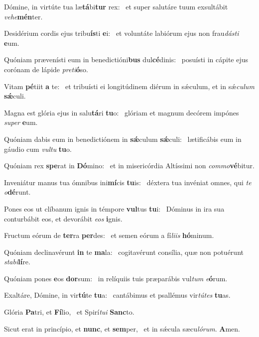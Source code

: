 \item Dómine, in virtúte tua læ\textbf{tá}bi\textbf{tur} rex:~\psstar{} et super salutáre tuum exsultábit \textit{vehe}\textbf{mén}ter.
\item Desidérium cordis ejus tribu\textbf{ís}ti \textbf{e}i:~\psstar{} et voluntáte labiórum ejus non frau\textit{dásti} \textbf{e}um.
\item Quóniam prævenísti eum in benedictióni\textbf{bus} dul\textbf{cé}dinis:~\psstar{} posuísti in cápite ejus corónam de lápide \textit{preti}\textbf{ó}so.
\item Vitam \textbf{pé}tiit \textbf{a} te:~\psstar{} et tribuísti ei longitúdinem diérum in sǽculum, et in sǽ\textit{culum} \textbf{sǽ}culi.
\item Magna est glória ejus in salu\textbf{tá}ri \textbf{tu}o:~\psstar{} glóriam et magnum decórem impónes \textit{super} \textbf{e}um.
\item Quóniam dabis eum in benedictiónem in \textbf{sǽ}culum \textbf{sǽ}culi:~\psstar{} lætificábis eum in gáudio cum \textit{vultu} \textbf{tu}o.
\item Quóniam rex \textbf{spe}rat in \textbf{Dó}mino:~\psstar{} et in misericórdia Altíssimi non \textit{commo}\textbf{vé}bitur.
\item Inveniátur manus tua ómnibus ini\textbf{mí}cis \textbf{tu}is:~\psstar{} déxtera tua invéniat omnes, qui \textit{te} \textit{o}\textbf{dé}runt.
\item Pones eos ut clíbanum ignis in témpore \textbf{vul}tus \textbf{tu}i:~\psstar{} Dóminus in ira sua conturbábit eos, et devorábit \textit{eos} \textbf{i}gnis.
\item Fructum eórum de \textbf{ter}ra \textbf{per}des:~\psstar{} et semen eórum a fí\textit{liis} \textbf{hó}minum.
\item Quóniam declinavérunt \textbf{in} te \textbf{ma}la:~\psstar{} cogitavérunt consília, quæ non potuérunt \textit{stabi}\textbf{lí}re.
\item Quóniam pones \textbf{e}os \textbf{dor}sum:~\psstar{} in relíquiis tuis præparábis vul\textit{tum} \textit{e}\textbf{ó}rum.
\item Exaltáre, Dómine, in vir\textbf{tú}te \textbf{tu}a:~\psstar{} cantábimus et psallémus vir\textit{tútes} \textbf{tu}as.
\item Glória \textbf{Pa}tri, et \textbf{Fí}lio,~\psstar{} et Spirí\textit{tui} \textbf{Sanc}to.
\item Sicut erat in princípio, et \textbf{nunc}, et \textbf{sem}per,~\psstar{} et in sǽcula sæcu\textit{lórum}. \textbf{A}men.